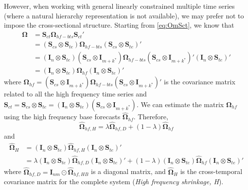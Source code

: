 \documentclass[a4paper,11pt]{article}
\newcommand{\Ivet}{\bm{I}}
\newcommand{\Svet}{\bm{S}}
\newcommand{\Omegavet}{\bm{\Omega}}
\theoremstyle{definition}
\begin{document}
However, when working with general linearly constrained multiple time series (where a natural hierarchy representation is not available), we may prefer not to impose the cross-sectional structure. Starting from \eqref{eq:OmSct}, we know that
\begin{align*}
	\Omegavet & = \Svet_{ct}\Omegavet_{hf-bts}\Svet_{ct}'                                                                                                                                                            \\
	          & = \left(\Svet_{cs} \otimes \Svet_{te}\right)\Omegavet_{hf-bts}\left(\Svet_{cs} \otimes \Svet_{te}\right)'                                                                                            \\
	          & = \left(\Ivet_n \otimes \Svet_{te}\right)\left(\Svet_{cs} \otimes \Ivet_{m+k^\ast}\right)\Omegavet_{hf-bts}\left(\Svet_{cs} \otimes \Ivet_{m+k^\ast}\right)'\left(\Ivet_n \otimes \Svet_{te}\right)' \\
	          & = \left(\Ivet_n \otimes \Svet_{te}\right)\Omegavet_{hf}\left(\Ivet_n \otimes \Svet_{te}\right)'
\end{align*}
where $\Omegavet_{hf} = \left(\Svet_{cs} \otimes \Ivet_{m+k^\ast}\right)\Omegavet_{hf-bts}\left(\Svet_{cs} \otimes \Ivet_{m+k^\ast}\right)'$ is the covariance matrix related to all the high frequency time series and $\Svet_{ct} = \Svet_{cs} \otimes \Svet_{te} = \left(\Ivet_n \otimes \Svet_{te}\right)\left(\Svet_{cs} \otimes \Ivet_{m+k^\ast}\right)$. We can estimate the matrix $\Omegavet_{hf}$ using the high frequency base forecasts $\widehat{\Omegavet}_{hf}$. Therefore,
$$
	\widehat{\Omegavet}_{hf, H} = \lambda \widehat{\Omegavet}_{hf, D} + (1-\lambda) \widehat{\Omegavet}_{hf}
$$
and
\begin{align*}
	\widehat{\Omegavet}_{H} & = (\Ivet_{n} \otimes \Svet_{te})\widehat{\Omegavet}_{hf, H} (\Ivet_{n} \otimes \Svet_{te})'                                                                                                            \\
	                        & = \lambda (\Ivet_{n} \otimes \Svet_{te})\widehat{\Omegavet}_{hf, D}(\Ivet_{n} \otimes \Svet_{te})' + (1-\lambda) (\Ivet_{n} \otimes \Svet_{te})\widehat{\Omegavet}_{hf}(\Ivet_{n} \otimes \Svet_{te})'
\end{align*}
where $\widehat{\Omegavet}_{hf, D} = \Ivet_{nm}\odot\widehat{\Omegavet}_{hf, HB}$ is a diagonal matrix, and $\widehat{\Omegavet}_{H}$ is the cross-temporal covariance matrix for the complete system (\textit{High frequency shrinkage, H}).
\end{document}
